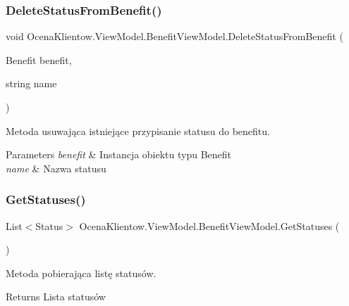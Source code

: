 \subsubsection{\texorpdfstring{Delete\+Status\+From\+Benefit()}{DeleteStatusFromBenefit()}}
{\footnotesize\ttfamily void Ocena\+Klientow.\+View\+Model.\+Benefit\+View\+Model.\+Delete\+Status\+From\+Benefit (\begin{DoxyParamCaption}\item[{Benefit}]{benefit,  }\item[{string}]{name }\end{DoxyParamCaption})\hspace{0.3cm}{\ttfamily [inline]}}



Metoda usuwająca istniejące przypisanie statusu do benefitu. 


\begin{DoxyParams}{Parameters}
{\em benefit} & Instancja obiektu typu Benefit\\
\hline
{\em name} & Nazwa statusu\\
\hline
\end{DoxyParams}
\hypertarget{class_ocena_klientow_1_1_view_model_1_1_benefit_view_model_aaab199bf68bdb87b910fdfe2cd45c1c6}{}\label{class_ocena_klientow_1_1_view_model_1_1_benefit_view_model_aaab199bf68bdb87b910fdfe2cd45c1c6} 
\subsubsection{\texorpdfstring{Get\+Statuses()}{GetStatuses()}}
{\footnotesize\ttfamily List$<$Status$>$ Ocena\+Klientow.\+View\+Model.\+Benefit\+View\+Model.\+Get\+Statuses (\begin{DoxyParamCaption}{ }\end{DoxyParamCaption})\hspace{0.3cm}{\ttfamily [inline]}}



Metoda pobierająca listę statusów. 

\begin{DoxyReturn}{Returns}
Lista statusów
\end{DoxyReturn}
\hypertarget{class_ocena_klientow_1_1_view_model_1_1_benefit_view_model_a820c19c8b1ca13a158ee775b325d8d44}{}\label{class_ocena_klientow_1_1_view_model_1_1_benefit_view_model_a820c19c8b1ca13a158ee775b325d8d44} 
